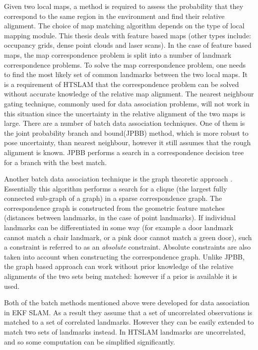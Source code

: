 Given two local maps, a method is required to assess the probability
that they correspond to the same region in the environment and find
their relative alignment. The choice of map matching algorithm depends
on the type of local mapping module. This thesis deals with feature
based maps (other types include: occupancy grids, dense point clouds and
laser scans). In the case of feature based maps, the map correspondence
problem is split into a number of landmark correspondence problems. To
solve the map correspondence problem, one needs to find the most likely
set of common landmarks between the two local maps. It is a requirement
of HTSLAM that the correspondence problem can be solved without accurate
knowledge of the relative map alignment. The nearest neighbour gating
technique, commonly used for data association problems, will not work in
this situation since the uncertainty in the relative alignment of the
two maps is large. There are a number of batch data association
techniques. One of them is the joint probability branch and bound(JPBB)
\cite{neira01:_data_assoc_stoch_mappin_using} method, which is more
robust to pose uncertainty, than nearest neighbour, however it still
assumes that the rough alignment is known. JPBB performs a search in a
correspondence decision tree for a branch with the best match.

Another batch data association technique is the graph theoretic
approach \cite{tardos02:_mappin_local_indoor_envir_using_sonar_data}.
Essentially this algorithm performs a search for a clique (the largest
fully connected sub-graph of a graph) in a sparse correspondence graph.
The correspondence graph is constructed from the geometric feature
matches (distances between landmarks, in the case of point landmarks).
If individual landmarks can be differentiated in some way (for example
a door landmark cannot match a chair landmark, or a pink door cannot match
a green door), such a constraint is referred to as an {\it absolute}
constraint. Absolute constraints are also taken into account when
constructing the correspondence graph. Unlike JPBB, the graph based
approach can work without prior knowledge of the relative alignments
of the two sets being matched: however if a prior is available it is
used.

Both of the batch methods mentioned above were developed for data
association in EKF SLAM. As a result they assume that a set of
uncorrelated observations is matched to a set of correlated
landmarks. However they can be easily extended to match two sets of
landmarks instead. In HTSLAM landmarks are uncorrelated, and so some
computation can be simplified significantly.

